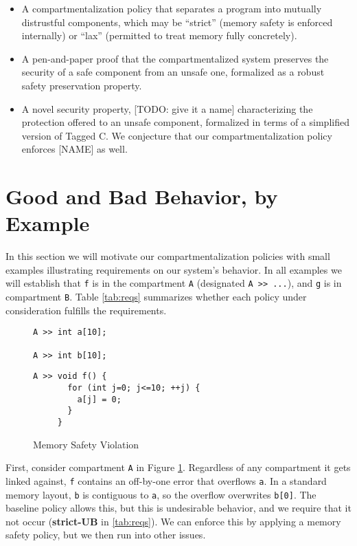 \documentclass{article}
\begin{document}
\begin{itemize}
\item A compartmentalization policy that separates a program into mutually distrustful
  components, which may be ``strict'' (memory safety is enforced internally) or ``lax''
  (permitted to treat memory fully concretely).
\item A pen-and-paper proof that the compartmentalized system preserves the security of a
  safe component from an unsafe one, formalized as a robust safety preservation property.
\item A novel security property, [TODO: give it a name] characterizing the protection offered
  to an unsafe component, formalized in terms of a simplified version of Tagged C. We conjecture
  that our compartmentalization policy enforces [NAME] as well.
\end{itemize}

\section{Good and Bad Behavior, by Example}

In this section we will motivate our compartmentalization policies with small
examples illustrating requirements on our system's behavior. In all examples we will establish
that {\tt f} is in the compartment {\tt A} (designated {\tt A >> ...}), and {\tt g} is in
compartment {\tt B}. Table \ref{tab:reqs} summarizes whether each policy under consideration fulfills
the requirements.

\begin{figure}
  \begin{minipage}[t]{0.45\textwidth}
\begin{verbatim}
A >> int a[10];

A >> int b[10];

\end{verbatim}
  \end{minipage}
  \begin{minipage}[t]{0.45\textwidth}
\begin{verbatim}
A >> void f() {
       for (int j=0; j<=10; ++j) {
         a[j] = 0;
       }
     }
\end{verbatim}
  \end{minipage}

  \caption{Memory Safety Violation}
  \label{fig:viol_strict}
\end{figure}

First, consider compartment {\tt A} in Figure \ref{fig:viol_strict}. Regardless of any compartment it
gets linked against, {\tt f} contains an off-by-one error that overflows {\tt a}. In
a standard memory layout, {\tt b} is contiguous to {\tt a}, so the overflow overwrites
{\tt b[0]}. The baseline policy allows this, but this is undesirable behavior, and
we require that it not occur ({\bf strict-UB} in \ref{tab:reqs}).
We can enforce this by applying a memory safety policy, but we then run into other issues.
\end{document}

